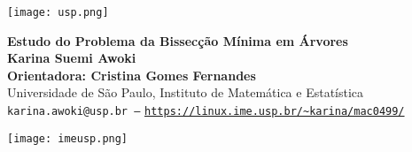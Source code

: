 \documentclass[a0,portrait]{a0poster}
\begin{document}


\begin{minipage}[b]{0.15\linewidth}
\texttt{[image: usp.png]}\\
\end{minipage}
\begin{minipage}[b]{0.70\linewidth}
\VeryHuge \center \color{NavyBlue} \textbf{Estudo do Problema da Bissecção Mínima em Árvores} \color{Black}\\ %
[0.68cm]
\huge \textbf{Karina Suemi Awoki}\\[0.5cm] %
\huge \textbf{Orientadora: Cristina Gomes Fernandes}\\[0.5cm] %

\huge Universidade de São Paulo, Instituto de Matemática e Estatística\\[0.2cm] %
\Large \texttt{karina.awoki@usp.br ---} 
\Large \texttt{\url{https://linux.ime.usp.br/~karina/mac0499/}}\\
\end{minipage}
%
\begin{minipage}[b]{0.15\linewidth}
\texttt{[image: imeusp.png]}\\
\end{minipage}

\vspace{1.cm} %

\end{document}
